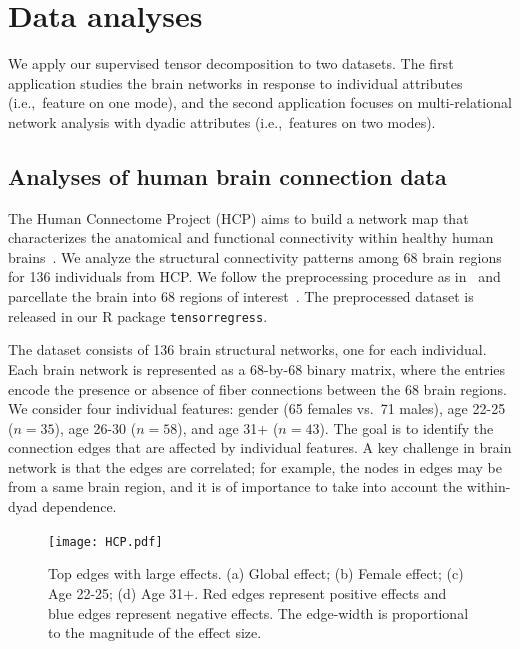 \documentclass[12pt]{article}
\theoremstyle{definition}
\theoremstyle{definition}
\begin{document}
\section{Data analyses}\label{sec:data}
We apply our supervised tensor decomposition to two datasets. The first application studies the brain networks in response to individual attributes (i.e.,\ feature on one mode), and the second application focuses on multi-relational network analysis with dyadic attributes (i.e.,\ features on two modes). 

\subsection{Analyses of human brain connection data}
The Human Connectome Project (HCP) aims to build a network map that characterizes the anatomical and functional connectivity within healthy human brains~\citep{HCP}. We analyze the structural connectivity patterns among 68 brain regions for 136 individuals from HCP. We follow the preprocessing procedure as in~\cite{zhang2018mapping} and parcellate the brain into 68 regions of interest~\citep{desikan2006automated}. The preprocessed dataset is released in our R package \texttt{tensorregress}. 

The dataset consists of 136 brain structural networks, one for each individual. Each brain network is represented as a 68-by-68 binary matrix, where the entries encode the presence or absence of fiber connections between the 68 brain regions. We consider four individual features: gender (65 females vs.\ 71 males), age 22-25 ($n=35$), age 26-30 ($n=58$), and age 31+ ($n=43$). The goal is to identify the connection edges that are affected by individual features. A key challenge in brain network is that the edges are correlated; for example, the nodes in edges may be from a same brain region, and it is of importance to take into account the within-dyad dependence. 

\begin{figure}[!h]
\centering
\texttt{[image: HCP.pdf]}
\caption{Top edges with large effects. (a) Global effect; (b) Female effect; (c) Age 22-25; (d) Age 31+. Red edges represent positive effects and blue edges represent negative effects. The edge-width is proportional to the magnitude of the effect size. }\label{fig:brain}
\end{figure}
\end{document}
